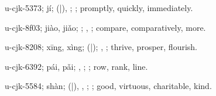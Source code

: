 \begin{multicols}{2}
{\cjkgGlue{}u-cjk-5373; jí; \cjkgGlue{}\cjkgGlue{}(\cjkgGlue{}|\cjkgGlue{}), \cjkgGlue{}\cjkgGlue{}\cjkgGlue{}; \cjkgGlue{}; promptly, quickly, immediately.

\cjkgGlue{}u-cjk-8f03; jiào, jiǎo; \cjkgGlue{}\cjkgGlue{}\cjkgGlue{}; \cjkgGlue{}, \cjkgGlue{}; compare, comparatively, more.

\cjkgGlue{}u-cjk-8208; xīng, xìng; \cjkgGlue{}\cjkgGlue{}(\cjkgGlue{}|\cjkgGlue{}); \cjkgGlue{}, \cjkgGlue{}; thrive, prosper, flourish.

\cjkgGlue{}u-cjk-6392; pái, pǎi; \cjkgGlue{}, \cjkgGlue{}; \cjkgGlue{}; row, rank, line.

\cjkgGlue{}u-cjk-5584; shàn; \cjkgGlue{}\cjkgGlue{}(\cjkgGlue{}|\cjkgGlue{}), \cjkgGlue{}\cjkgGlue{}\cjkgGlue{}, \cjkgGlue{}\cjkgGlue{}\cjkgGlue{}; \cjkgGlue{}; good, virtuous, charitable, kind.

}
\end{multicols}
